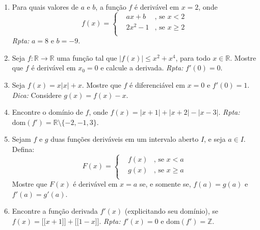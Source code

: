 \documentclass[latin,20pt]{article}
\begin{document}
\begin{enumerate}
$$\begin{array}{lll}
    &ax^2+b &\text{, se } x \leq 1 \\
    &x^{-1}    &\text{, se } x > 1 \\
    \end{array}
    \right. 
    $$
    Para quais valores de $a$ e $b$, a função $f$ é derivável em $x=1$. 
    {\it Rpta: } $a=-1/3$, $b=4/3$. {\it Dica: } Para $f$ ser derivável em $x=$1, a derivada deve existir e $f$ deve ser continua em $x=1$. 
    \item Para quais valores de $a$ e $b$, a função $f$ 
    é derivável em $x=2$, onde  
    $$
    f(x)= \left\{  
    \begin{array}{lll}
    &ax+b &\text{, se } x < 2 \\
    &2x^{2}-1    &\text{, se } x \geq 2 \\
    \end{array}
    \right. $$
    {\it Rpta: } $a=8$ e $b=-9$.
    \item Seja 
    $f:\mathbb{R}\rightarrow \mathbb{R}$ uma função tal que $|f(x)|\leq x^{2}+x^{4}$, 
    para todo $x \in \mathbb{R}$. 
    Mostre que $f$ é derivável em $x_{0}=0$ e 
    calcule a derivada. 
    {\it Rpta: } $f'(0)=0$.
    \item Seja $f(x)=x|x|+x$. 
    Mostre que $f$ é diferenciável em $x=0$ 
    e $f'(0)=1$. {\it Dica: } Considere $g(x)=f(x)-x$.
    \item Encontre o domínio de $f$, onde $f(x)=|x+1|+|x+2|-|x-3|$.
    {\it Rpta:} $\text{dom}(f')=\mathbb{R}\setminus \{-2,-1,3\}$.   
    \item Sejam $f$ e $g$ duas funções deriváveis 
    em um intervalo aberto 
    $I$, e seja $a \in I$. Defina:
    $$
    F(x)= \left\{  
    \begin{array}{lll}
    &f(x) &\text{, se } x < a \\
    &g(x)    &\text{, se } x \geq  a \\
    \end{array}
    \right. 
    $$
    Mostre que $F(x)$ é derivável em $x=a$ se, e somente se, 
    $f(a)=g(a)$ e $f'(a)=g'(a)$. 
    \item Encontre a função derivada $f'(x)$ (explicitando seu domínio), se $f(x)=\lbrack\!\lbrack x+1 \rbrack\!\rbrack
    +\lbrack\!\lbrack 1-x\rbrack\!\rbrack$. 
    {\it Rpta:} $f'(x)=0$ e $\text{dom}(f')=\mathbb{Z}$.
   \end{enumerate}
\end{document}
